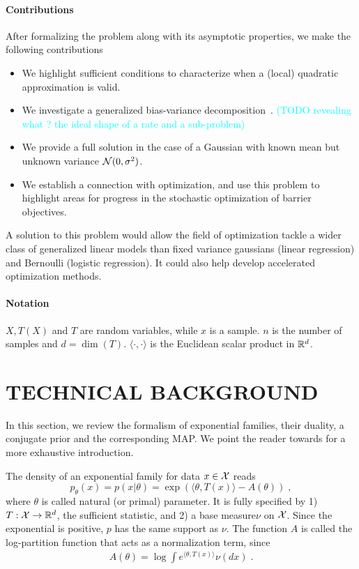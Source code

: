 \documentclass[twoside]{article}
\let\oldsection\section
\renewcommand{\section}[1]{\oldsection{\texorpdfstring{\uppercase{#1}}{#1}}}
\newcommand{\TODO}[1]{\textcolor{cyan}{(TODO #1)}}
\newcommand{\logpart}{A}
\newcommand{\nat}{\theta}
\begin{document}
\paragraph{Contributions}
After formalizing the problem along with its asymptotic properties, we make the following contributions
\begin{itemize}
	\itemsep0em 
	\item We highlight sufficient conditions to characterize when a (local) quadratic approximation is valid.
	\item We investigate a generalized bias-variance decomposition~\citep{pfau2013generalized}. \TODO{revealing what ? the ideal shape of a rate and a sub-problem}
	\item We provide a full solution in the case of a Gaussian with known mean but unknown variance ${\mathcal N}(0,\sigma^2)$.
	\item We establish a connection with optimization, and use this problem to highlight areas for progress in the stochastic optimization of barrier objectives.
\end{itemize}

A solution to this problem would allow the field of optimization tackle a wider class of generalized linear models than fixed variance gaussians (linear regression) and Bernoulli (logistic regression).
It could also help develop accelerated optimization methods.

\paragraph{Notation}
$X, T(X)$ and $T$ are random variables, while $x$ is a sample. 
$n$ is the number of samples and $d= \dim(T)$. 
$\langle \cdot , \cdot \rangle$ is the Euclidean scalar product in $\mathbb{R}^d$.


\section{Technical background}
In this section, we review the formalism of exponential families, their duality, a conjugate prior and the corresponding MAP.
We point the reader towards \citet[Chapter 3]{wainwright2008graphical} for a more exhaustive introduction.


The density of an exponential family for data $x \in {\mathcal X}$ reads
\begin{equation}
	 p_\nat(x) = p(x|\nat) = \exp( \langle \nat, T(x) \rangle - \logpart(\nat)) \; ,
	 \label{eq:def_expfamily}
\end{equation}
where  $\nat$ is called natural (or primal) parameter.
It is fully specified by 1) $T: {\mathcal X} \rightarrow \mathbb{R}^d$, the sufficient statistic, and 2) a base measure$\nu$ on ${\mathcal X}$.
Since the exponential is positive, $p$ has the same support as $\nu$.
The function $\logpart$ is called the log-partition function that acts as a normalization term, since
\begin{align}
    \logpart(\nat) = \log \int e^{\langle \nat, T(x) \rangle} \nu(dx) \; .
\end{align}
\end{document}
